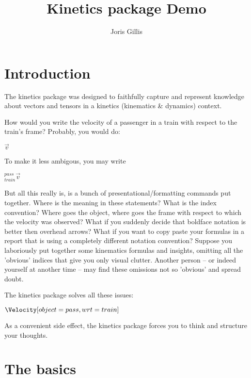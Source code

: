 \documentclass[10pt,a4paper]{article}
\title{Kinetics package Demo}
\author{Joris Gillis}
\begin{document}
\maketitle

\section{Introduction}

The kinetics package was designed to faithfully capture and represent knowledge about vectors and tensors in a kinetics (kinematics \& dynamics) context.

How would you write the velocity of a passenger in a train with respect to the train's frame?
Probably, you would do:

\begin{SideBySideExample}[xrightmargin=1cm,frame=single]
  $\vec{v}$
\end{SideBySideExample}

To make it less ambigous, you may write
\begin{SideBySideExample}[xrightmargin=1cm,frame=single]
  ${^{pass}_{train}}\vec{v}$
\end{SideBySideExample}

But all this really is, is a bunch of presentational/formatting commands put together. Where is the meaning in these statements?
What is the index convention? Where goes the object, where goes the frame with respect to which the velocity was observed? What if you suddenly decide that boldface notation is better then overhead arrows?
What if you want to copy paste your formulas in a report that is using a completely different notation convention? Suppose you laboriously put together some kinematics formulas and insights, omitting all the 'obvious' indices that give you only visual clutter.
Another person -- or indeed yourself at another time -- may find these omissions not so 'obvious' and spread doubt. 


The kinetics package solves all these issues:

\begin{SideBySideExample}[xrightmargin=1cm,frame=single]
  $\Velocity[object=pass,wrt=train]$
\end{SideBySideExample}

As a convenient side effect, the kinetics package forces you to think and structure your thoughts.


\section{The basics}
\end{document}
